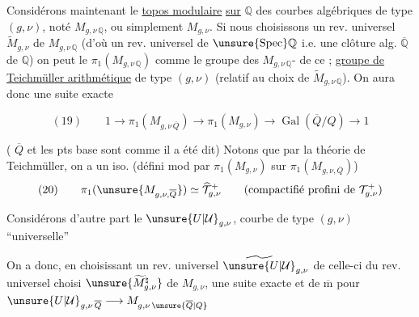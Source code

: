 Considérons maintenant le \uline{topos modulaire} \uline{sur} $\mathbb{Q}$ des courbes algébriques de type $(g,\nu)$, noté $M_{g,\nu\,\mathbb{Q}}$, ou simplement $M_{g,\nu}$. Si nous choisissons un rev. universel $\widetilde{M}_{g,\nu}$ de $M_{g,\nu\,\mathbb{Q}}$ (d'où un rev. universel de $\unsure{\operatorname{Spec}}\mathbb{Q}$ i.e. une clôture alg. $\overline{\mathbb{Q}}$ de $\mathbb{Q}$) on peut  le $\pi_1(M_{g,\nu\,\mathbb{Q}})$ comme le groupe des $M_{g,\nu\,\mathbb{Q}}$- de ce ;   \uline{groupe de Teichmüller arithmétique} de type $(g,\nu)$ (relatif au choix de $\widetilde{M}_{g,\nu\,\mathbb{Q}}$). On aura donc une suite exacte


\[
(19)\qquad 1\longrightarrow \pi_1(M_{g,\nu\,\overline{Q}})
\longrightarrow \pi_1(M_{g,\nu})
\longrightarrow \operatorname{Gal}(\overline{Q}/Q)\longrightarrow 1
\]

( $\overline{Q}$ et les pts base sont  comme il a été dit) Notons que par la théorie  de Teichmüller, on a un iso. (défini mod   par $\pi_1(M_{g,\nu})$ sur $\pi_1(M_{g,\nu,\overline{Q}})$)
\[
(20)\qquad \pi_1(\unsure{M_{g,\nu,\overline{Q}}})\simeq\widehat{\mathcal{T}}_{g,\nu}^{+}
\qquad (\text{compactifié profini de }\mathcal{T}_{g,\nu}^{+})
\]

Considérons d'autre part le  $\unsure{U|\mathcal{U}}_{g,\nu}$, courbe de type $(g,\nu)$ ``universelle''

On a donc, en choisissant un rev. universel $\widetilde{\unsure{U|\mathcal{U}}}_{g,\nu}$ de celle-ci \uline{} du rev. universel choisi $\unsure{\widetilde{M}_{g,\nu}^{\natural}}$ de $M_{g,\nu}$, une suite exacte
et de $\overline{\mathrm m}$ pour $\unsure{U|\mathcal{U}}_{g,\nu\,\overline{Q}}\longrightarrow M_{g,\nu\,\unsure{\overline{Q}|Q}}$

